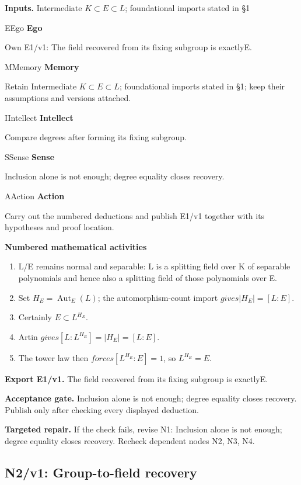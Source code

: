 \documentclass[preprint,12pt,aps,pra,showkeys,amsmath,amssymb,superscriptaddress,floatfix]{revtex4-2}
\theoremstyle{definition}
\theoremstyle{remark}
\newcommand{\mmfaculty}[3]{%
 \begin{mmfacultybox}{#1}{#2}
 {\sffamily\bfseries\color{MMBlue}#2}\par\smallskip #3
 \end{mmfacultybox}}
\newcommand{\field}[2]{\par\smallskip\noindent\textbf{#1.} #2\par}
\begin{document}
\field{Inputs}{Intermediate \(K\subset E\subset L\); foundational imports stated in §1}

\mmfaculty{E}{Ego}{Own E1/v1: The field recovered from its fixing subgroup is exactlyE.}

\mmfaculty{M}{Memory}{Retain Intermediate \(K\subset E\subset L\); foundational imports stated
in §1; keep their assumptions and versions attached.}

\mmfaculty{I}{Intellect}{Compare degrees after forming its fixing subgroup.}

\mmfaculty{S}{Sense}{Inclusion alone is not enough; degree equality closes recovery.}

\mmfaculty{A}{Action}{Carry out the numbered deductions and publish E1/v1 together with its
hypotheses and proof location.}

\smallskip\noindent\textbf{Numbered mathematical activities}

\begin{enumerate}[label=N1.\arabic*,leftmargin=3.4em]

\item L/E remains normal and separable: L is a splitting field over K of
separable polynomials and hence also a splitting field of those
polynomials over E.

\item Set \(H_E=\operatorname{Aut} _E(L)\); the automorphism-count import
\(gives|H_E|=[L:E]\).

\item Certainly \(E\subset L^{H_E}\).

\item Artin \(gives[L:L^{H_E}]=|H_E|=[L:E]\).

\item The tower law then \(forces[L^{H_E}:E]=1\), so \(L^{H_E}=E\).

\end{enumerate}

\field{Export E1/v1}{The field recovered from its fixing subgroup is exactlyE.}

\field{Acceptance gate}{Inclusion alone is not enough; degree equality closes recovery. Publish
only after checking every displayed deduction.}

\field{Targeted repair}{If the check fails, revise N1: Inclusion alone is not enough; degree
equality closes recovery. Recheck dependent nodes N2, N3, N4.}

\clearpage

\subsection{N2/v1: Group-to-field recovery}
\end{document}
